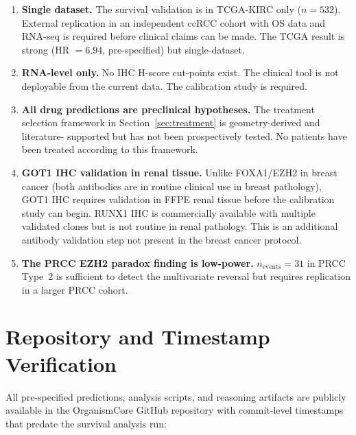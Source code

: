 \documentclass[11pt, a4paper]{article}
\begin{document}
\begin{enumerate}

    \item \textbf{Single dataset.}
    The survival validation is in
    TCGA-KIRC only ($n = 532$).
    External replication in an
    independent ccRCC cohort with
    OS data and RNA-seq is required
    before clinical claims can
    be made. The TCGA result is
    strong (HR $= 6.94$, pre-specified)
    but single-dataset.

    \item \textbf{RNA-level only.}
    No IHC H-score cut-points exist.
    The clinical tool is not deployable
    from the current data. The
    calibration study is required.

    \item \textbf{All drug predictions
    are preclinical hypotheses.}
    The treatment selection framework
    in Section~\ref{sec:treatment}
    is geometry-derived and literature-
    supported but has not been
    prospectively tested. No patients
    have been treated according to
    this framework.

    \item \textbf{GOT1 IHC validation
    in renal tissue.}
    Unlike FOXA1/EZH2 in breast cancer
    (both antibodies are in routine
    clinical use in breast pathology),
    GOT1 IHC requires validation in FFPE
    renal tissue before the calibration
    study can begin. RUNX1 IHC is
    commercially available with multiple
    validated clones but is not routine
    in renal pathology. This is an
    additional antibody validation step
    not present in the breast cancer
    protocol.

    \item \textbf{The PRCC EZH2 paradox
    finding is low-power.}
    $n_\text{events} = 31$ in PRCC
    Type~2 is sufficient to detect the
    multivariate reversal but requires
    replication in a larger PRCC cohort.

\end{enumerate}

\section{Repository and Timestamp
Verification}
\label{sec:repo}

All pre-specified predictions, analysis
scripts, and reasoning artifacts are publicly
available in the OrganismCore GitHub repository
with commit-level timestamps that predate the
survival analysis run:
\end{document}
